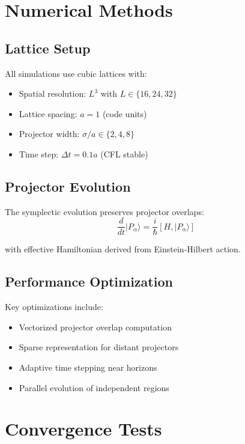 \documentclass[11pt,a4paper]{article}
\begin{document}
\appendix

\section{Numerical Methods}

\subsection{Lattice Setup}

All simulations use cubic lattices with:
\begin{itemize}
\item Spatial resolution: $L^3$ with $L \in \{16, 24, 32\}$
\item Lattice spacing: $a = 1$ (code units)
\item Projector width: $\sigma/a \in \{2, 4, 8\}$
\item Time step: $\Delta t = 0.1a$ (CFL stable)
\end{itemize}

\subsection{Projector Evolution}

The symplectic evolution preserves projector overlaps:
\begin{equation}
\frac{d}{dt}|P_\alpha\rangle = \frac{i}{\hbar}[H, |P_\alpha\rangle]
\end{equation}

with effective Hamiltonian derived from Einstein-Hilbert action.

\subsection{Performance Optimization}

Key optimizations include:
\begin{itemize}
\item Vectorized projector overlap computation
\item Sparse representation for distant projectors
\item Adaptive time stepping near horizons
\item Parallel evolution of independent regions
\end{itemize}

\section{Convergence Tests}
\end{document}
